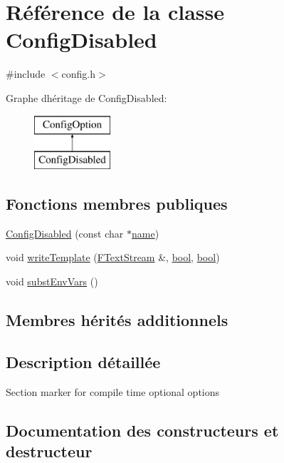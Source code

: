 \hypertarget{class_config_disabled}{}\section{Référence de la classe Config\+Disabled}
\label{class_config_disabled}


{\ttfamily \#include $<$config.\+h$>$}

Graphe d\textquotesingle{}héritage de Config\+Disabled\+:\begin{figure}[H]
\begin{center}
\leavevmode
\includegraphics[height=2.000000cm]{class_config_disabled}
\end{center}
\end{figure}
\subsection*{Fonctions membres publiques}
\begin{DoxyCompactItemize}
\item 
\hyperlink{class_config_disabled_a82bb5fed35515825e100630d2d974926}{Config\+Disabled} (const char $\ast$\hyperlink{class_config_option_a2f226c32b0c447c1fa628660f42859c4}{name})
\item 
void \hyperlink{class_config_disabled_a5319ee3a5cab4a4e46f3f860b4a7cdcd}{write\+Template} (\hyperlink{class_f_text_stream}{F\+Text\+Stream} \&, \hyperlink{qglobal_8h_a1062901a7428fdd9c7f180f5e01ea056}{bool}, \hyperlink{qglobal_8h_a1062901a7428fdd9c7f180f5e01ea056}{bool})
\item 
void \hyperlink{class_config_disabled_abee32dc488cf8350c44fa2203efd126d}{subst\+Env\+Vars} ()
\end{DoxyCompactItemize}
\subsection*{Membres hérités additionnels}


\subsection{Description détaillée}
Section marker for compile time optional options 

\subsection{Documentation des constructeurs et destructeur}
\hypertarget{class_config_disabled_a82bb5fed35515825e100630d2d974926}{}
